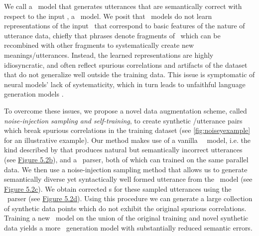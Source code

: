 We call a \naturallanguagegeneration~model that generates utterances 
that are semantically correct with respect to the input 
\meaningrepresentation, a \faithfulgeneration~model.
We posit that \sequencetosequence~models do not learn representations
of the input \meaningrepresentation~that correspond to basic features of the nature of utterance data, chiefly
that phrases denote fragments of \meaningrepresentation~which can be recombined with other fragments to systematically create new meanings/utterances. Instead, the learned representations are highly idiosyncratic, and often reflect spurious correlations and 
artifacts of the dataset that do not generalize well outside the training data.
This issue is symptomatic of 
neural models' lack of systematicity, which in turn  leads
to unfaithful language generation models
\citep{lake18}.





To overcome these issues, we propose a novel data augmentation scheme,
called \textit{noise-injection sampling and self-training}, to
create synthetic \meaningrepresentation/utterance pairs which break spurious
correlations in the training dataset (see \autoref{fig:noiseyexample} for an
illustrative example). Our method makes use of a vanilla
\sequencetosequence~\naturallanguagegeneration~model, i.e. the kind described
by \citet{dusek2020} that produces natural but semantically incorrect
utterances (see \hyperref[fig:noiseyexample]{Figure 5.2b}), and a \meaningrepresentation~parser, both of which can
trained on the same parallel data.  We then use a noise-injection sampling
method \citep{cho2016} that allows us to generate semantically diverse yet
syntactically well formed utterance from the \naturallanguagegeneration~model
(see \hyperref[fig:noiseyexample]{Figure 5.2c}).
We obtain corrected \meaningrepresentation s for these sampled utterances using the
\meaningrepresentation~parser (see \hyperref[fig:noiseyexample]{Figure 5.2d}).  Using this procedure we can generate a
large collection of synthetic data points which do not exhibit the original spurious correlations. Training a new
\sequencetosequence~model on the union of the original training and novel
synthetic data yields a more \faithful~generation model with substantially
reduced semantic errors.



